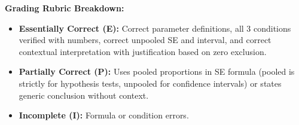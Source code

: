\begin{frqrubricbox}
\textbf{Grading Rubric Breakdown:}\\
\begin{itemize}
  \item \textbf{Essentially Correct (E):} Correct parameter definitions, all 3 conditions verified with numbers, correct unpooled SE and interval, and correct contextual interpretation with justification based on zero exclusion.
  \item \textbf{Partially Correct (P):} Uses pooled proportions in SE formula (pooled is strictly for hypothesis tests, unpooled for confidence intervals) or states generic conclusion without context.
  \item \textbf{Incomplete (I):} Formula or condition errors.
\end{itemize}
\end{frqrubricbox}

